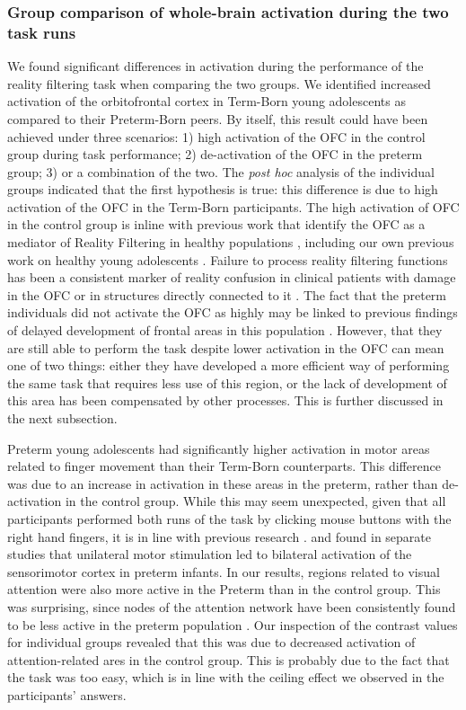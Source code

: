\subsubsection{Group comparison of whole-brain activation during the two task runs}
We found significant differences in activation during the performance of the reality filtering task when comparing the two groups. We identified increased activation of the orbitofrontal cortex in Term-Born young adolescents as compared to their Preterm-Born peers. By itself, this result could have been achieved under three scenarios: 1) high activation of the OFC in the control group during task performance; 2) de-activation of the OFC in the preterm group; 3) or a combination of the two.  The \textit{post hoc} analysis of the individual groups indicated that the first hypothesis is true: this difference is due to high activation of the OFC in the Term-Born participants. The high activation of OFC in the control group is inline with previous work that identify the OFC as a mediator of Reality Filtering in healthy populations \citep{Schnider2000, Treyer2003,Bouzerda-Wahlen2015, Schnider2018, Theze2019}, including our own previous work on healthy young adolescents \citep{Liverani2020}. Failure to process reality filtering functions has been a consistent marker of reality confusion in clinical patients with damage in the OFC or in structures directly connected to it \citep{Schnider1999, Nahum2012}. The fact that the preterm individuals did not activate the OFC as highly may be linked to previous findings of delayed development of frontal areas in this population \citep{Nosarti2014, Sripada2018}. However, that they are still able to perform the task despite lower activation in the OFC can mean one of two things: either they have developed a more efficient way of performing the same task that requires less use of this region, or the lack of development of this area has been compensated by other processes. This is further discussed in the next subsection.

Preterm young adolescents had significantly higher activation in motor areas related to finger movement than their Term-Born counterparts. This difference was due to an increase in activation in these areas in the preterm, rather than de-activation in the control group. While this may seem unexpected, given that all participants performed both runs of the task by clicking mouse buttons with the right hand fingers, it is in line with previous research \citep{Heep2009, Arichi2010, Allievi2016}. \citet{Heep2009} and  \citet{Arichi2010} found in separate studies that unilateral motor stimulation led to bilateral activation of the sensorimotor cortex in preterm infants. In our results, regions related to visual attention were also more active in the Preterm than in the control group. This was surprising, since nodes of the attention network have been consistently found to be less active in the preterm population \citep{Olsen2018}. Our inspection of the contrast values for individual groups revealed that this was due to decreased activation of attention-related ares in the control group. This is probably due to the fact that the task was too easy, which is in line with the ceiling effect we observed in the participants' answers.

